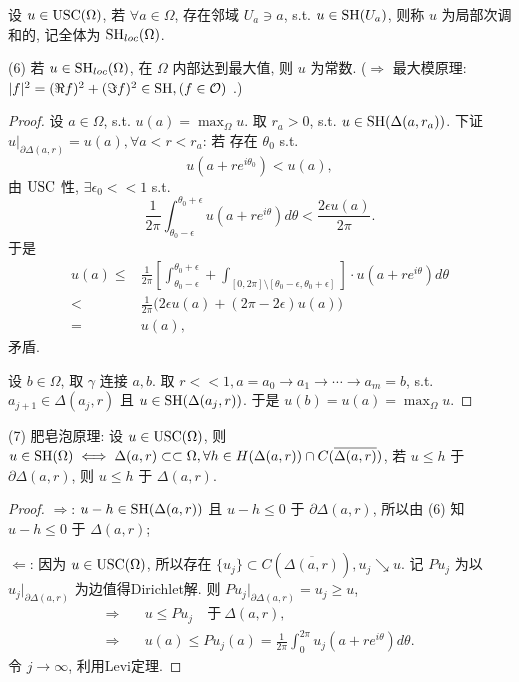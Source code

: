 \begin{definition}
  设 $u \in \operatorname{USC}(\Omega )$, 若 $\forall a \in \Omega $, 存在邻域 $U_a \ni a$, s.t. $u \in \operatorname{SH}(U_a)$, 则称 $u$ 为局部次调和的, 记全体为 $\operatorname{SH}_{loc}(\Omega )$.      
\end{definition}

\noindent (6)
若 $u \in \operatorname{SH}_{loc}(\Omega )$, 在 $\Omega $ 内部达到最大值, 则 $u$ 为常数. ($\Rightarrow $ 最大模原理: $|f|^2=(\Re f)^2+(\Im f)^2 \in \operatorname{SH}, (f \in \mathcal{O})$ .)   
\begin{proof}
  设 $a \in \Omega $, s.t. $u(a)=\max_{\Omega }u$.
  取 $r_a >0$, s.t. $u\in \operatorname{SH}(\Delta (a,r_a))$.
  下证 $u|_{\partial \Delta (a,r)}=u(a), \forall a<r<r_a$:   
  若 存在 $\theta _0$ s.t. 
  $$ u(a+re^{i \theta _0})<u(a) ,$$ 
  由 $\operatorname{USC}$ 性, $\exists \epsilon _0 <<1$ s.t. 
  $$ \frac{1}{2 \pi } \int_{\theta _0 -\epsilon }^{\theta_0 +\epsilon } u(a+re^{i \theta })d \theta  < \frac{2 \epsilon u(a)}{2 \pi }.$$  
  于是 
  $$ \begin{aligned}
    u(a) \leq & \frac{1}{2 \pi }\left[  \int_{\theta _0 -\epsilon }^{\theta_0 +\epsilon } + \int_{[0,2 \pi ] \setminus [\theta _0-\epsilon ,\theta _0+\epsilon ]} \right] \cdot u(a+r e^{i \theta }) d \theta \\
    < & \frac{1}{2 \pi }\big( 2 \epsilon u(a)+ (2 \pi -2 \epsilon )u(a)\big)\\
    =& u(a),
  \end{aligned}  $$
矛盾. 

设 $b \in \Omega $, 取 $\gamma $ 连接 $a,b$. 取 $r<<1, a=a_0 \to a_1 \to \cdots \to a_m=b$, s.t. $a_{j+1} \in \Delta (a_j,r)$ 且 $u \in \operatorname{SH}(\Delta (a_j,r))$. 
于是 $u(b)=u(a)=\max_{\Omega }u$.       
\end{proof}

\noindent (7) 肥皂泡原理: 
设 $u \in \operatorname{USC}(\Omega )$, 则 $u \in \operatorname{SH}(\Omega ) \iff \Delta (a,r) \subset \subset \Omega , \forall h \in H(\Delta (a,r)) \cap C(\overline{\Delta (a,r)})$, 若 $u \leq h$ 于 $\partial \Delta (a,r)$, 则 $u \leq h$ 于 $\Delta (a,r)$.      
\begin{proof}
  $\Rightarrow $: $u-h \in \operatorname{SH} (\Delta (a,r))$ 且 $u-h \leq 0$ 于 $\partial \Delta (a,r)$, 所以由 (6) 知 $u-h \leq 0$ 于 $ \Delta (a,r)$;
  
  $\Leftarrow $: 因为 $u \in \operatorname{USC}(\Omega )$, 所以存在 $\{u_j\} \subset C(\overline{\Delta (a,r)}), u_j \searrow u$. 
  记 $P u_j$ 为以 $u_j|_{\partial \Delta (a,r)}$ 为边值得Dirichlet解. 则 $Pu_j|_{\partial \Delta (a,r)}=u_j \geq u$,
  $$ \begin{aligned}
    \Rightarrow \quad& u \leq Pu_j \quad \text{于} ~ \Delta (a,r),\\
     \Rightarrow \quad& u(a) \leq Pu_j(a)=\frac{1}{2 \pi }\int_{0}^{2 \pi } u_j(a+r e^{i \theta }) d \theta .
  \end{aligned}  $$      
  令 $j \to \infty $, 利用Levi定理. 
\end{proof}

